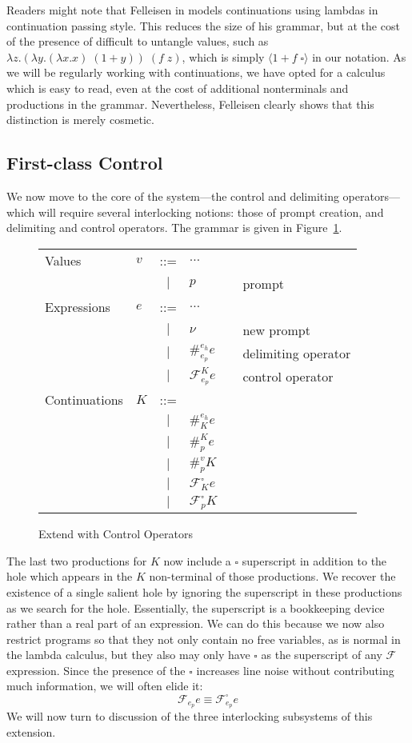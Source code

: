 \documentclass[11pt]{article}
\newcommand{\maybePage}{\newpage}
\newcommand\x{\lambda x}
\newcommand\F{\mathcal{F}}
\newcommand{\angles}[1]{\langle#1\rangle}
\begin{document}
Readers might note that Felleisen in \cite{PromptApplication} models continuations using lambdas in continuation passing style.
This reduces the size of his grammar, but at the cost of the presence of difficult to untangle values, such as $\lambda z.(\lambda y.(\x.x)\;(1+y))\;(f\;z)$, which is simply $\angles{1 + f\;\square}$ in our notation.
As we will be regularly working with continuations, we have opted for a calculus which is easy to read, even at the cost of additional nonterminals and productions in the grammar.
Nevertheless, Felleisen clearly shows that this distinction is merely cosmetic.


\maybePage
\subsection{First-class Control}

We now move to the core of the system---the control and delimiting operators---which will require several interlocking notions:
those of prompt creation, and delimiting and control operators.
The grammar is given in Figure~\ref{fig:addControl}.

\begin{figure}[H]
\caption{Extend with Control Operators}
\label{fig:addControl}

\begin{tabular}{llclll}
Values & $v$ & ::= & $\ldots$ \\
& & $|$ & $p$ && prompt \\
Expressions & $e$ & ::= & $\ldots$ \\
& & $|$ & $\nu$ && new prompt \\
& & $|$ & $\#_{e_p}^{e_h}e$ && delimiting operator \\
& & $|$ & $\F_{e_p}^Ke$ && control operator \\
Continuations & $K$ & ::= & \\
& & $|$ & $\#_{K}^{e_h}e$ &&  \\
& & $|$ & $\#_{p}^{K}e$ &&  \\
& & $|$ & $\#_{p}^{v}K$ &&  \\
& & $|$ & $\F_{K}^{\square}e$ &&  \\
& & $|$ & $\F_{p}^{\square}K$ &&  \\
\end{tabular}
\end{figure}

The last two productions for $K$ now include a $\square$ superscript in addition to the hole which appears in the $K$ non-terminal of those productions.
We recover the existence of a single salient hole by ignoring the superscript in these productions as we search for the hole.
Essentially, the superscript is a bookkeeping device rather than a real part of an expression.
We can do this because we now also restrict programs so that they not only contain no free variables, as is normal in the lambda calculus, but they also may only have $\square$ as the superscript of any $\F$ expression.
Since the presence of the $\square$ increases line noise without contributing much information, we will often elide it:
$$\F_{e_p}e \equiv \F_{e_p}^{\square}e$$
We will now turn to discussion of the three interlocking subsystems of this extension.
\end{document}
